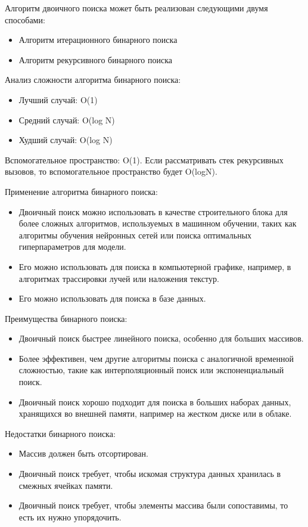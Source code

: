 Алгоритм двоичного поиска может быть реализован следующими двумя способами:
\begin{itemize}
\item Алгоритм итерационного бинарного поиска
\item Алгоритм рекурсивного бинарного поиска
\end{itemize}

Анализ сложности алгоритма бинарного поиска:
\begin{itemize}
\item Лучший случай: O(1)
\item Средний случай: O(log N)
\item Худший случай: O(log N)
\end{itemize}

Вспомогательное пространство: O(1). Если рассматривать стек рекурсивных вызовов, то вспомогательное пространство будет O(logN).

Применение алгоритма бинарного поиска:
\begin{itemize}
\item Двоичный поиск можно использовать в качестве строительного блока для более сложных алгоритмов, используемых в машинном обучении, таких как алгоритмы обучения нейронных сетей или поиска оптимальных гиперпараметров для модели.
\item Его можно использовать для поиска в компьютерной графике, например, в алгоритмах трассировки лучей или наложения текстур.
\item Его можно использовать для поиска в базе данных.
\end{itemize}

Преимущества бинарного поиска:
\begin{itemize}
\item Двоичный поиск быстрее линейного поиска, особенно для больших массивов.
\item Более эффективен, чем другие алгоритмы поиска с аналогичной временной сложностью, такие как интерполяционный поиск или экспоненциальный поиск.
\item Двоичный поиск хорошо подходит для поиска в больших наборах данных, хранящихся во внешней памяти, например на жестком диске или в облаке.
\end{itemize}

Недостатки бинарного поиска:
\begin{itemize}
\item Массив должен быть отсортирован.
\item Двоичный поиск требует, чтобы искомая структура данных хранилась в смежных ячейках памяти.
\item Двоичный поиск требует, чтобы элементы массива были сопоставимы, то есть их нужно упорядочить. \cite{geeks_binary}
\end{itemize}

